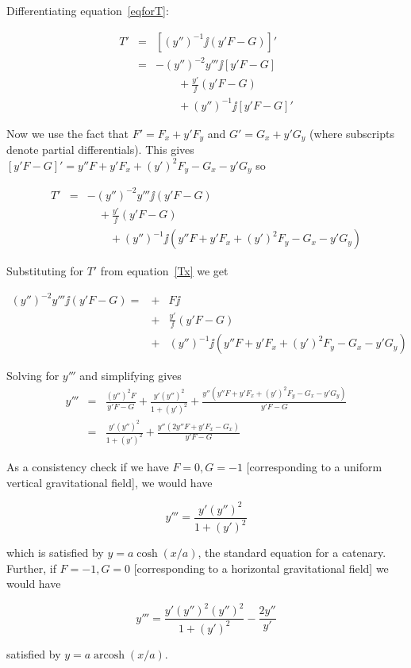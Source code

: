 \documentclass{article}
\begin{document}
Differentiating equation~\ref{eqforT}:

\begin{eqnarray}
  T'&=& \left[(y'')^{-1}\jj(y'F-G)\right]'\nonumber\\
  &=& -(y'')^{-2}y'''\jj\left[y'F-G\right]\nonumber\\
  &{}& \qquad +\frac{y'}{\jj}(y'F-G)\nonumber\\
  &{}& \quad\quad + (y'')^{-1}\jj\left[y'F-G\right]'
\end{eqnarray}

Now we use the fact that $F'=F_x+y'F_y$ and $G'=G_x+y'G_y$ (where
subscripts denote partial differentials).  This gives
$\left[y'F-G\right]'=y''F+y'F_x+(y')^2F_y-G_x-y'G_y$ so

\begin{eqnarray}
 T' &=& -(y'')^{-2}y'''\jj\left(y'F-G\right)\nonumber\\
  &{}&\quad +\frac{y'}{\jj}(y'F-G)\nonumber\\
 &{}& \quad\quad+(y'')^{-1}\jj
 \left( y''F+y'F_x+(y')^2F_y-G_x-y'G_y \right)
\end{eqnarray}

Substituting for $T'$ from equation~\ref{Tx} we get

\begin{eqnarray}
  (y'')^{-2}y'''\jj(y'F-G)=&+&F\jj\nonumber\\
  &+&\frac{y'}{\jj}(y'F-G)\\
  &+&(y'')^{-1}\jj\left(y''F+y'F_x+(y')^2F_y-G_x-y'G_y  \right)
  \nonumber
\end{eqnarray}
  

Solving for $y'''$ and simplifying gives
\begin{eqnarray}
  y'''&=&\frac{(y'')^2F}{y'F-G}
  + \frac{y'(y'')^2}{1+(y')^2}
  + \frac{y''\left(y''F+y'F_x+(y')^2F_y-G_x-y'G_y \right)}{y'F-G}\\
 &=&
   \frac{y'(y'')^2}{1+(y')^2}
  + \frac{y''\left(2y''F+y'F_x-G_x\right)}{y'F-G}
\end{eqnarray}

As a consistency check if we have $F=0,G=-1$ [corresponding to a
  uniform vertical gravitational field], we would have

\begin{equation}
  y'''=\frac{y'(y'')^2}{1+(y')^2}
\end{equation}

which is satisfied by $y=a\cosh(x/a)$, the standard equation for a
catenary.  Further, if $F=-1,G=0$ [corresponding to a horizontal
  gravitational field] we would have

\begin{equation}
  y''' = \frac{y'(y'')^2\left(y''\right)^2}{1+(y')^2}-\frac{2y''}{y'}
\end{equation}

satisfied by $y=a\operatorname{arcosh}(x/a)$.



\end{document}
